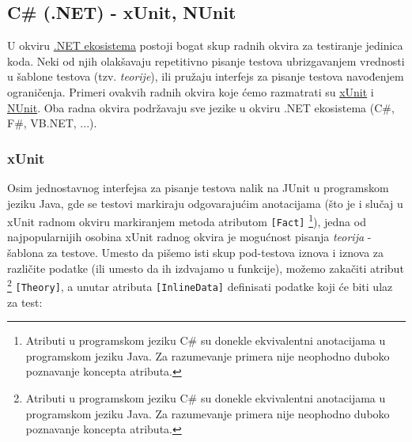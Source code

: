 \subsection{C\# (.NET) - xUnit, NUnit}\label{c-net---xunit-nunit}

U okviru \href{https://dotnet.microsoft.com/}{.NET ekosistema} postoji bogat skup radnih okvira za testiranje jedinica koda. Neki od njih olakšavaju repetitivno pisanje testova ubrizgavanjem vrednosti u šablone testova (tzv. \emph{teorije}), ili pružaju interfejs za pisanje testova navođenjem ograničenja. Primeri ovakvih radnih okvira koje ćemo razmatrati su \href{https://xunit.net/}{xUnit} i \href{https://nunit.org/}{NUnit}. Oba radna okvira podržavaju sve jezike u okviru .NET ekosistema (C\#, F\#, VB.NET, ...).

\subsubsection{xUnit}\label{xunit}

Osim jednostavnog interfejsa za pisanje testova nalik na JUnit u programskom jeziku Java, gde se testovi markiraju odgovarajućim anotacijama (što je i slučaj u xUnit radnom okviru markiranjem metoda atributom \texttt{{[}Fact{]}} \footnote{Atributi u programskom jeziku C\# su donekle ekvivalentni anotacijama u programskom jeziku Java. Za razumevanje primera nije neophodno duboko poznavanje koncepta atributa.}), jedna od najpopularnijih osobina xUnit radnog okvira je mogućnost pisanja \emph{teorija} - šablona za testove. Umesto da pišemo isti skup pod-testova iznova i iznova za različite podatke (ili umesto da ih izdvajamo u funkcije), možemo zakačiti atribut \footnote{Atributi u programskom jeziku C\# su donekle ekvivalentni anotacijama u programskom jeziku Java. Za razumevanje primera nije neophodno duboko poznavanje koncepta atributa.} \texttt{{[}Theory{]}}, a unutar atributa \texttt{{[}InlineData{]}} definisati podatke koji će biti ulaz za test:

